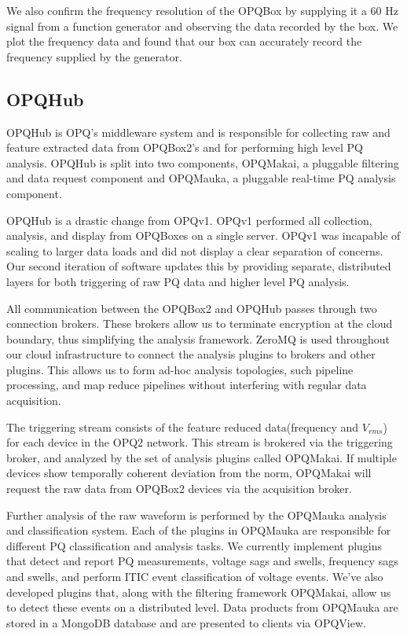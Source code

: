 \documentclass[a4paper, conference]{IEEEtran}
\begin{document}
We also confirm the frequency resolution of the OPQBox by supplying it a 60 Hz signal from a function generator and observing the data recorded by the box. We plot the frequency data and found that our box can accurately record the frequency supplied by the generator.

\subsection{OPQHub}
OPQHub is OPQ's middleware system and is responsible for collecting raw and feature extracted data from OPQBox2's and for performing high level PQ analysis.  OPQHub is split into two components, OPQMakai, a pluggable filtering and data request component and OPQMauka, a pluggable real-time PQ analysis component.

OPQHub is a drastic change from OPQv1. OPQv1 performed all collection, analysis, and display from OPQBoxes on a single server. OPQv1 was incapable of scaling to larger data loads and did not display a clear separation of concerns. Our second iteration of software updates this by providing separate, distributed layers for both triggering of raw PQ data and higher level PQ analysis.

All communication between the OPQBox2 and OPQHub passes through two connection brokers. These brokers allow us to terminate encryption at the cloud boundary, thus simplifying the analysis framework. ZeroMQ is used throughout our cloud infrastructure to connect the analysis plugins to brokers and other plugins. This allows us to form ad-hoc analysis topologies, such pipeline processing, and map reduce pipelines without interfering with regular data acquisition.

The triggering stream consists of the feature reduced data(frequency and $V_{rms}$) for each device in the OPQ2 network. This stream is brokered via the triggering broker, and analyzed by the set of analysis plugins called OPQMakai. If multiple devices show temporally coherent deviation from the norm, OPQMakai will request the raw data from OPQBox2 devices via the acquisition broker. 

Further analysis of the raw waveform is performed by the OPQMauka analysis and classification system. Each of the plugins in OPQMauka are responsible for different PQ classification and analysis tasks. We currently implement plugins that detect and report PQ measurements, voltage sags and swells, frequency sags and swells, and perform ITIC event classification of voltage events. We've also developed plugins that, along with the filtering framework OPQMakai, allow us to detect these events on a distributed level. Data products from OPQMauka are stored in a MongoDB database and are presented to clients via OPQView.
\end{document}
